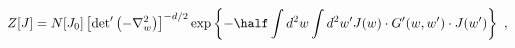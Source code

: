 \begin{equation}
  Z[J]= N[J_0]\left[ {\det}'  \left( -\nabla_w^2\right) \right]^{-d/2}
  \exp \left\{ -\half \int d^2 w
  \int d^2 w' J(w)\cdot G'(w,w')\cdot J(w') \right\} \ ,
\end{equation}


